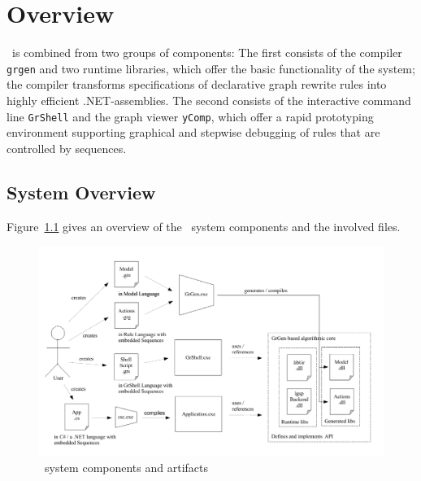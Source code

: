 \chapter{Overview}
\label{chp:overview}

\GrG\ is combined from two groups of components:
The first consists of the compiler \texttt{grgen} and two runtime libraries, which offer the basic functionality of the system;
the compiler transforms specifications of declarative graph rewrite rules into highly efficient .NET-assemblies.
The second consists of the interactive command line \texttt{GrShell} and the graph viewer \texttt{yComp},
which offer a rapid prototyping environment supporting graphical and stepwise debugging of rules that are controlled by sequences.

\section{System Overview}

Figure~\ref{figsys} gives an overview of the \GrG\ system components and the involved files.

\begin{figure}[htbp]
  \centering
  \includegraphics[width=\textwidth]{fig/OverviewGenerationArtefacts}
  \caption{\GrG\ system components and artifacts}
  \label{figsys}
\end{figure}

